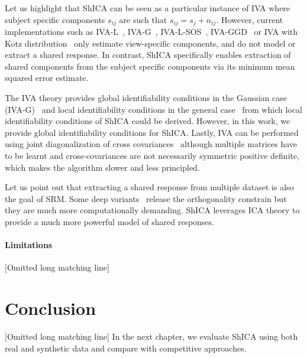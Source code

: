 Let us highlight that ShICA can be seen as a particular instance of IVA where
subject specific components $s_{ij}$ are such that $s_{ij} = s_j + n_{ij}$.
However, current implementations such as IVA-L~\cite{lee2008independent},
IVA-G~\cite{anderson2011joint}, IVA-L-SOS~\cite{bhinge2019extraction}, IVA-GGD~\cite{anderson2014independent} or
IVA with Kotz distribution~\cite{anderson2013independent} only estimate
view-specific components, and do not model or extract a shared response.
In contrast, ShICA specifically enables extraction of shared components from the
subject specific components via its minimum mean squared error estimate.

The IVA theory provides global identifiability conditions in the Gaussian case (IVA-G)~\cite{via2011joint} and local identifiability conditions in the general case~\cite{anderson2014independent} from which local identifiability conditions of ShICA could be derived. However, in this work, we provide global identifiability conditions for ShICA.
Lastly, IVA can be performed using joint diagonalization of cross covariances~\cite{li2011joint, congedo2012orthogonal} although multiple matrices have to be learnt and cross-covariances are not necessarily symmetric positive definite, which makes the algorithm slower and less principled.

Let us point out that extracting a shared response from multiple dataset is also
the goal of SRM. Some deep variants~\cite{chen2016convolutional} release the
orthogonality constrain but they are much more computationally demanding.
ShICA leverages ICA theory to provide a much more powerful model of shared responses.

\paragraph{Limitations}
[Omitted long matching line]

\section{Conclusion}
[Omitted long matching line]
In the next chapter, we evaluate ShICA using both real and synthetic data and
compare with competitive approaches.
